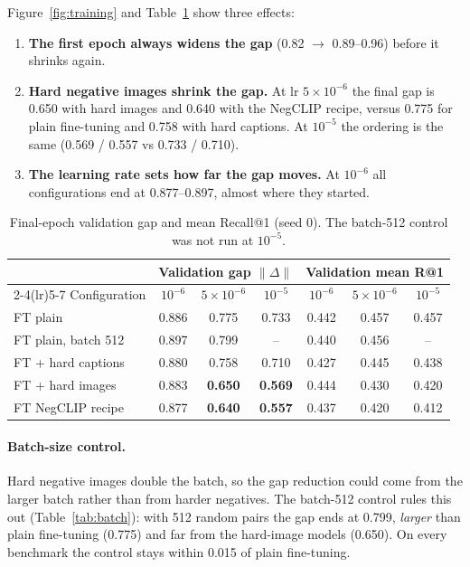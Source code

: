 \documentclass[11pt,a4paper]{article}
\newcommand{\gapv}{\Delta}
\begin{document}
Figure~\ref{fig:training} and Table~\ref{tab:valgap} show three effects:
\begin{enumerate}
\item \textbf{The first epoch always widens the gap} (0.82 $\to$ 0.89--0.96) before it shrinks again.
\item \textbf{Hard negative images shrink the gap.} At lr $5\times10^{-6}$ the final gap is 0.650 with
hard images and 0.640 with the NegCLIP recipe, versus 0.775 for plain fine-tuning and 0.758 with hard
captions. At $10^{-5}$ the ordering is the same (0.569 / 0.557 vs 0.733 / 0.710).
\item \textbf{The learning rate sets how far the gap moves.} At $10^{-6}$ all configurations end at
0.877--0.897, almost where they started.
\end{enumerate}

\begin{table}[H]
\centering\small
\caption{Final-epoch validation gap and mean Recall@1 (seed 0). The batch-512 control was not run at $10^{-5}$.}
\label{tab:valgap}
\begin{tabular}{@{}lcccccc@{}}
\toprule
& \multicolumn{3}{c}{Validation gap $\lVert\gapv\rVert$} & \multicolumn{3}{c}{Validation mean R@1}\\
\cmidrule(lr){2-4}\cmidrule(lr){5-7}
Configuration & $10^{-6}$ & $5\times10^{-6}$ & $10^{-5}$ & $10^{-6}$ & $5\times10^{-6}$ & $10^{-5}$\\
\midrule
FT plain & 0.886 & 0.775 & 0.733 & 0.442 & 0.457 & 0.457\\
FT plain, batch 512 & 0.897 & 0.799 & -- & 0.440 & 0.456 & --\\
FT + hard captions & 0.880 & 0.758 & 0.710 & 0.427 & 0.445 & 0.438\\
FT + hard images & 0.883 & \textbf{0.650} & \textbf{0.569} & 0.444 & 0.430 & 0.420\\
FT NegCLIP recipe & 0.877 & \textbf{0.640} & \textbf{0.557} & 0.437 & 0.420 & 0.412\\
\bottomrule
\end{tabular}
\end{table}

\paragraph{Batch-size control.}
Hard negative images double the batch, so the gap reduction could come from the larger batch rather
than from harder negatives. The batch-512 control rules this out (Table~\ref{tab:batch}): with 512
random pairs the gap ends at 0.799, \emph{larger} than plain fine-tuning (0.775) and far from the hard-image
models (0.650). On every benchmark the control stays within 0.015 of plain fine-tuning.
\end{document}
